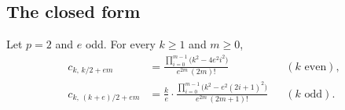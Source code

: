 \subsection{The closed form}
\label{sec:closed-form}

\begin{theorem}
\label{thm:closed-form}
Let $p = 2$ and $e$ odd. For every $k \ge 1$ and $m \ge 0$,
\begin{align}
  c_{k,\,k/2 + em}
    &= \frac{\prod_{i=0}^{m-1}\bigl(k^2 - 4e^2 i^2\bigr)}{e^{2m}\,(2m)!}
    &&(k \text{ even}), \label{eq:cf-even}\\[2pt]
  c_{k,\,(k+e)/2 + em}
    &= \frac{k}{e}\cdot
       \frac{\prod_{i=0}^{m-1}\bigl(k^2 - e^2(2i+1)^2\bigr)}{e^{2m}\,(2m+1)!}
    &&(k \text{ odd}). \label{eq:cf-odd}
\end{align}
\end{theorem}

